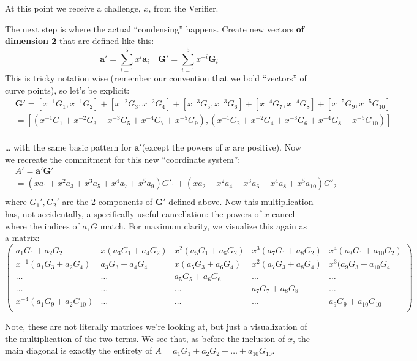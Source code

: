 \documentclass[10pt,a4paper]{article}
\begin{document}
At this point we receive a challenge, $x$, from the Verifier.

The next step is where the actual ``condensing'' happens. Create new
vectors \textbf{of dimension 2} that are defined like this:
\[\textbf{a}' = \sum\limits_{i=1}^5 x^i \textbf{a}_i \quad \textbf{G}' = \sum\limits_{i=1}^5 x^{-i} \textbf{G}_i\]
This is tricky notation wise (remember our convention that we bold
``vectors'' of curve points), so let's be explicit:
\begin{align*}
 & \textbf{G}' = [x^{-1}G_1, x^{-1}G_2] +  [x^{-2}G_3, x^{-2}G_4] + [x^{-3}G_5, x^{-3}G_6] + [x^{-4}G_7, x^{-4}G_8] + [x^{-5}G_9, x^{-5}G_{10}] \\
& = [\left(x^{-1}G_1 + x^{-2}G_3 + x^{-3}G_5 + x^{-4}G_7 + x^{-5}G_9\right),
 \left(x^{-1}G_2 + x^{-2}G_4 + x^{-3}G_6 + x^{-4}G_8 + x^{-5}G_{10}\right)] \\
\end{align*}

\ldots{} with the same basic pattern for $\mathbf{a}'$(except the powers of $x$ are
positive). Now we recreate the commitment for this new ``coordinate
system'':
\begin{align*}
& A' = \textbf{a}'\textbf{G}' \\
& = (xa_1 + x^2 a_3 + x^3 a_5 + x^4 a_7 + x^5 a_9)G'_1 + (xa_2 + x^2 a_4 + x^3 a_6 + x^4 a_8 + x^5 a_{10}) G'_2  \\
\end{align*}
where $G_1', G_2'$ are the 2 components of $\mathbf{G}'$ defined above. Now this multiplication
has, not accidentally, a specifically useful cancellation: the powers of
 $x$ cancel where the indices of $a, G$ match. For maximum clarity, we visualize
this again as a matrix:
\[
\begin{pmatrix}
a_1G_1 + a_2G_2 & x(a_3G_1 + a_4G_2) & x^2(a_5G_1 + a_6 G_2) & x^3(a_7G_1 + a_8 G_2) & x^4(a_9G_1 + a_{10}G_{2})\\
x^{-1}(a_1G_3+a_2G_4) & a_3G_3 + a_4G_4 & x(a_5G_3 + a_6G_4) & x^2(a_7G_3 + a_8G_4)& x^3(a_9G_3 + a_{10}G_4 \\
\dots & \dots & a_5G_5 + a_6G_6 & \dots & \dots \\
\dots & \dots & \dots & a_7G_7 + a_8G_8& \dots  \\
x^{-4}(a_1G_9 + a_2G_{10}) & \dots & \dots & \dots & a_9 G_9 + a_{10}G_{10} \\
\end{pmatrix}
\]

Note, these are not literally matrices we're looking at, but just a
visualization of the multiplication of the two terms. We see that, as
before the inclusion of $x$, the main diagonal is exactly the entirety of $A = a_1G_1 + a_2G_2 + \ldots + a_{10}G_{10}$.
\end{document}
